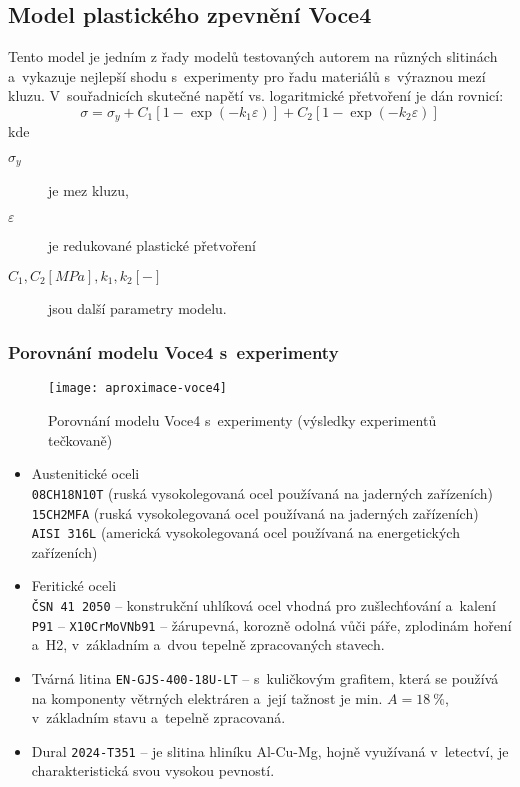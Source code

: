 
\subsection{Model plastického zpevnění Voce4}\label{sec:model-voce-4}
Tento model je jedním z řady modelů testovaných autorem na různých slitinách a~vykazuje nejlepší shodu s~experimenty pro řadu materiálů s~výraznou mezí kluzu.
V~souřadnicích skutečné napětí vs. logaritmické přetvoření je dán rovnicí:
\begin{equation}
	\sigma = \sigma_y + C_1 \left[ 1 - \exp\left(-k_1 \varepsilon\right) \right] + C_2 \left[ 1 - \exp\left(-k_2 \varepsilon\right) \right]
\end{equation}
kde
\begin{description}
	\item[$\sigma_y$]je mez kluzu,
	\item[$\varepsilon$] je redukované plastické přetvoření
	\item[{$C_1, C_2  [MPa], k_1, k_2 [-]$}] jsou další parametry modelu.
\end{description}

\subsubsection{Porovnání modelu Voce4 s~experimenty}
\begin{figure}[H]
	\centering
	\texttt{[image: aproximace-voce4]}
	\caption{Porovnání modelu Voce4 s~experimenty (výsledky experimentů tečkovaně)}
	\label{fig:aproximace-voce4}
\end{figure}

\begin{itemize}
	\item Austenitické oceli\\
	\texttt{08CH18N10T} (ruská vysokolegovaná ocel používaná na jaderných zařízeních)\\
	\texttt{15CH2MFA} (ruská vysokolegovaná ocel používaná na jaderných zařízeních)\\
	\texttt{AISI 316L} (americká vysokolegovaná ocel používaná na energetických zařízeních)
	\item Feritické oceli\\
	\texttt{ČSN 41 2050} -- konstrukční uhlíková ocel vhodná pro zušlechťování a~kalení\\
	\texttt{P91} -- \texttt{X10CrMoVNb91} -- žárupevná, korozně odolná vůči páře, zplodinám hoření a~H2, v~základním a~dvou tepelně zpracovaných stavech.
	\item Tvárná litina \texttt{EN-GJS-400-18U-LT} -- s kuličkovým grafitem, která se používá na komponenty větrných elektráren a~její tažnost je min. $A = \SI{18}{\%}$, v~základním stavu a~tepelně zpracovaná.
	\item Dural \texttt{2024-T351} -- je slitina hliníku Al-Cu-Mg, hojně využívaná v~letectví, je charakteristická svou vysokou pevností.
\end{itemize}
